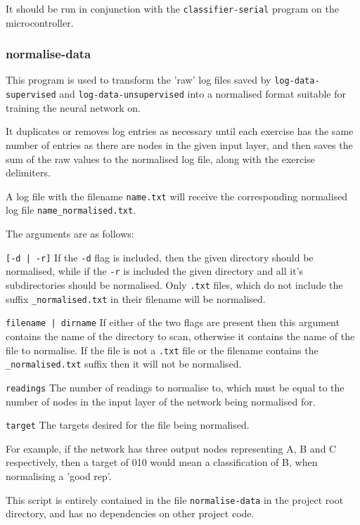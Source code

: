 \documentclass[a4paper]{article}
\begin{document}
It should be run in conjunction with the \lstinline{classifier-serial} program on the microcontroller.

\subsubsection{normalise-data}
\label{subsubsec:dc_csa_normalise}

This program is used to transform the 'raw' log files saved by \lstinline{log-data-supervised} and \lstinline{log-data-unsupervised} into a normalised format suitable for training the neural network on. 

It duplicates or removes log entries as necessary until each exercise has the same number of entries as there are nodes in the given input layer, and then saves the sum of the raw values to the normalised log file, along with the exercise delimiters.

A log file with the filename \lstinline{name.txt} will receive the corresponding normalised log file \lstinline{name_normalised.txt}.

The arguments are as follows:

\lstinline{[-d | -r]} If the \lstinline{-d} flag is included, then the given directory should be normalised, while if the \lstinline{-r} is included the given directory and all it's subdirectories should be normalised. Only \lstinline{.txt} files, which do not include the suffix \lstinline{_normalised.txt} in their filename will be normalised.

\lstinline{filename | dirname} If either of the two flags are present then this argument contains the name of the directory to scan, otherwise it contains the name of the file to normalise. If the file is not a \lstinline{.txt} file or the filename contains the \lstinline{_normalised.txt} suffix then it will not be normalised.

\lstinline{readings} The number of readings to normalise to, which must be equal to the number of nodes in the input layer of the network being normalised for.

\lstinline{target} The targets desired for the file being normalised.

For example, if the network has three output nodes representing A, B and C respectively, then a target of 010 would mean a classification of B, when normalising a 'good rep'.

This script is entirely contained in the file \lstinline{normalise-data} in the project root directory, and has no dependencies on other project code.
\end{document}
